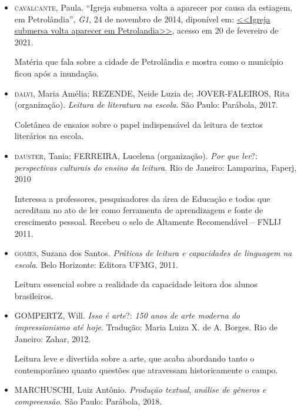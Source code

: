 \documentclass[12pt]{extarticle}
\begin{document}
\begin{itemize}

   \item \textsc{cavalcante}, Paula. ``Igreja submersa volta a aparecer por causa da
    estiagem, em Petrolândia'', \emph{G1}, 24 de novembro de 2014,
    diponível em:
    \href{http://g1.globo.com/pe/caruaru-regiao/noticia/2014/11/igreja-submersa-volta-aparecer-por-causa-da-estiagem-em-petrolandia.html}{<<Igreja submersa volta aparecer em Petrolandia>>},
    acesso em 20 de fevereiro de 2021.

    Matéria que fala sobre a cidade de Petrolândia e mostra como o
    município ficou após a inundação.

  \item  \textsc{dalvi}, Maria Amélia; REZENDE, Neide Luzia de; JOVER-FALEIROS, Rita
    (organização). \emph{Leitura de literatura na escola}. São Paulo:
    Parábola, 2017.

    Coletânea de ensaios sobre o papel indispensável da leitura de
    textos literários na escola.
\item  \textsc{dauster}, Tania; FERREIRA, Lucelena (organização). \emph{Por que
    ler}?: \emph{perspectivas culturais do ensino da leitura}. Rio de
    Janeiro: Lamparina, Faperj, 2010

    Interessa a professores, pesquisadores da área de Educação e todos
    que acreditam no ato de ler como ferramenta de aprendizagem e fonte
    de crescimento pessoal. Recebeu o selo de Altamente Recomendável --
    FNLIJ 2011.

\item     \textsc{gomes}, Suzana dos Santos. \emph{Práticas de leitura e capacidades de
    linguagem na escola}. Belo Horizonte: Editora UFMG, 2011.

    Leitura essencial sobre a realidade da capacidade leitora dos alunos
    brasileiros.

\item     \textsc{GOMPERTZ}, Will. \emph{Isso é arte}?: \emph{150 anos de arte moderna
    do impressionismo até hoje}. Tradução: Maria Luiza X. de A. Borges.
    Rio de Janeiro: Zahar, 2012.

    Leitura leve e divertida sobre a arte, que acaba abordando tanto o
    contemporâneo quanto questões que atravessam historicamente o campo.

\item     \textsc{MARCHUSCHI}, Luiz Antônio\textsc{.} \emph{Produção textual},
    \emph{análise de gêneros e compreensão}. São Paulo: Parábola, 2018.


\end{itemize}
\end{document}

